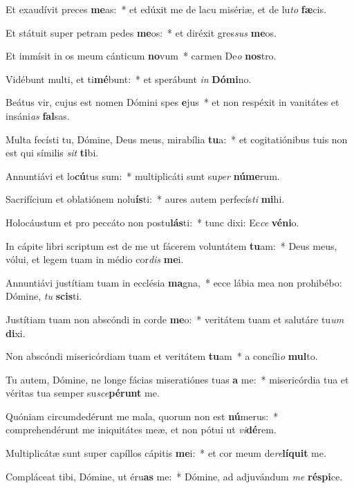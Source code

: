 \item Et exaudívit preces \textbf{me}as:~* et edúxit me de lacu misériæ, et de lu\textit{to} \textbf{fæ}cis.
\item Et státuit super petram pedes \textbf{me}os:~* et diréxit gres\textit{sus} \textbf{me}os.
\item Et immísit in os meum cánticum \textbf{no}vum~* carmen De\textit{o} \textbf{nos}tro.
\item Vidébunt multi, et ti\textbf{mé}bunt:~* et sperábunt \textit{in} \textbf{Dó}\textbf{mi}no.
\item Beátus vir, cujus est nomen Dómini spes \textbf{e}jus~* et non respéxit in vanitátes et insáni\textit{as} \textbf{fal}sas.
\item Multa fecísti tu, Dómine, Deus meus, mirabília \textbf{tu}a:~* et cogitatiónibus tuis non est qui símilis \textit{sit} \textbf{ti}bi.
\item Annuntiávi et lo\textbf{cú}tus sum:~* multiplicáti sunt su\textit{per} \textbf{nú}\textbf{me}rum.
\item Sacrifícium et oblatiónem nolu\textbf{ís}ti:~* aures autem perfecís\textit{ti} \textbf{mi}hi.
\item Holocáustum et pro peccáto non postu\textbf{lás}ti:~* tunc dixi: Ec\textit{ce} \textbf{vé}\textbf{ni}o.
\item In cápite libri scriptum est de me ut fácerem voluntátem \textbf{tu}am:~* Deus meus, vólui, et legem tuam in médio cor\textit{dis} \textbf{me}i.
\item Annuntiávi justítiam tuam in ecclésia \textbf{ma}gna,~* ecce lábia mea non prohibébo: Dómine, \textit{tu} \textbf{scis}ti.
\item Justítiam tuam non abscóndi in corde \textbf{me}o:~* veritátem tuam et salutáre tu\textit{um} \textbf{di}xi.
\item Non abscóndi misericórdiam tuam et veritátem \textbf{tu}am~* a concíli\textit{o} \textbf{mul}to.
\item Tu autem, Dómine, ne longe fácias miseratiónes tuas \textbf{a} me:~* misericórdia tua et véritas tua semper su\textit{sce}\textbf{pé}\textbf{runt} me.
\item Quóniam circumdedérunt me mala, quorum non est \textbf{nú}merus:~* comprehendérunt me iniquitátes meæ, et non pótui ut \textit{vi}\textbf{dé}rem.
\item Multiplicátæ sunt super capíllos cápitis \textbf{me}i:~* et cor meum de\textit{re}\textbf{lí}\textbf{quit} me.
\item Compláceat tibi, Dómine, ut éru\textbf{as} me:~* Dómine, ad adjuvándum \textit{me} \textbf{ré}\textbf{spi}ce.

